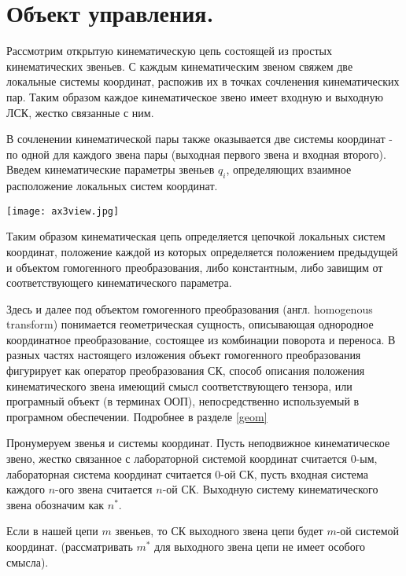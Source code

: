 \section{Объект управления.}

Рассмотрим открытую кинематическую цепь состоящей из простых кинематических звеньев. С каждым кинематическим звеном свяжем две локальные системы координат, распожив их в точках сочленения кинематических пар. Таким образом каждое кинематическое звено имеет входную и выходную ЛСК, жестко связанные с ним.

В сочленении кинематической пары также оказывается две системы координат - по одной для каждого звена пары (выходная первого звена и входная второго). Введем кинематические параметры звеньев $q_i$, определяющих взаимное расположение локальных систем координат.

\begin{center}
  \texttt{[image: ax3view.jpg]}
  \label{}
\end{center}

Таким образом кинематическая цепь определяется цепочкой локальных систем координат, положение каждой из которых определяется положением предыдущей и объектом гомогенного преобразования, либо константным, либо завищим от соответствующего кинематического параметра.

\colorbox{shadecolor}
{\parbox{0.9\textwidth}{Здесь и далее под объектом гомогенного преобразования (англ. homogenous transform) понимается геометрическая сущность, описывающая однородное координатное преобразование, состоящее из комбинации поворота и переноса. В разных частях настоящего изложения объект гомогенного преобразования фигурирует как оператор преобразования СК, способ описания положения кинематического звена имеющий смысл соответствующего тензора, или програмный объект (в терминах ООП), непосредственно используемый в програмном обеспечении. Подробнее в разделе \ref{geom}}}

Пронумеруем звенья и системы координат. Пусть неподвижное кинематическое звено, жестко связанное с лабораторной системой координат считается 0-ым, лабораторная система координат считается 0-ой СК, пусть входная система каждого $n$-ого звена считается $n$-ой СК. Выходную систему кинематического звена обозначим как $n^*$. 

Если в нашей цепи $m$ звеньев, то СК выходного звена цепи будет $m$-ой системой координат. (рассматривать $m^*$ для выходного звена цепи не имеет особого смысла).


